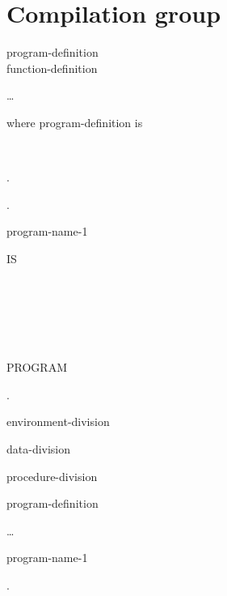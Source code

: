 \chapter{Compilation group}

\begin{0-1}
  program-definition \\
  function-definition
\end{0-1} \ldots

where program-definition is\vspace{1em}\newline
\begin{0-1}
  \begin{1=}
     \\
  \end{1=}
  .
\end{0-1} \newline
{}.
\begin{1=}
  program-name-1 \\
  \miscext{\literal}
\end{1=}
\begin{0-1}  \literal \end{0-1}
\begin{0-1} IS
  \begin{1=}
    \begin{1+}
       \\

      \begin{1=}
         \\
      \end{1=}
    \end{1+} \\

  \end{1=}
  PROGRAM
\end{0-1}. \newline
{} \newline
\begin{0-1}
  environment-division
\end{0-1} \newline
\begin{0-1}
  data-division
\end{0-1} \newline
\begin{0-1}
  procedure-division
  \begin{0-1}
    program-definition
  \end{0-1} \ldots
\end{0-1} \newline
\begin{0-1}
   
  \begin{1=}
    program-name-1 \\
  \end{1=}.
\end{0-1}

